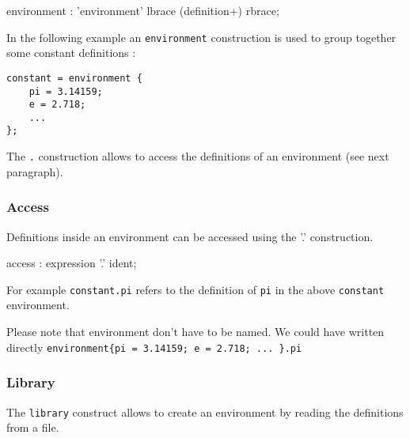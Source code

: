 
\begin{rail}
environment : 'environment' lbrace (definition+) rbrace; 
\end{rail}

In the following example an \lstinline'environment' construction is used to group together some constant definitions :

\begin{lstlisting}
constant = environment {
	pi = 3.14159;
	e = 2.718;
	...
};
\end{lstlisting}
The  \lstinline'.' construction allows to access the definitions of an environment (see next paragraph).

\subsubsection{Access} 
Definitions inside an environment can be accessed using 
the '.' construction. 


\begin{rail}
access :    expression '.' ident;       
\end{rail}

For example \lstinline'constant.pi' refers to the definition of \lstinline'pi' in the above \lstinline'constant' environment.

Please note that environment don't have to be named. We could have written directly 
\lstinline'environment{pi = 3.14159; e = 2.718; ... }.pi'

\subsubsection{Library} 
The \lstinline'library' construct allows to create an environment by reading the definitions from a file.


